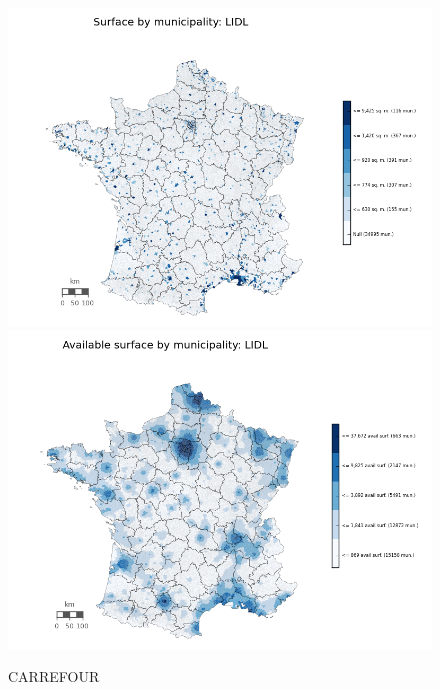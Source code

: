 \documentclass[11pt]{article}
\begin{document}
\begin{figure}[H]
    \caption{CARREFOUR}
	\centering
		\includegraphics[width=15cm]{images/maps_surface/LIDL.png}
        \includegraphics[width=15cm]{images/maps_available_surface/LIDL.png}
\end{figure}
\end{document}
